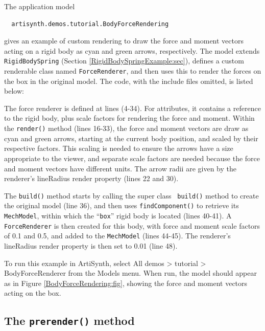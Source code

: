The application model
%
\begin{verbatim}
  artisynth.demos.tutorial.BodyForceRendering
\end{verbatim}
%
gives an example of custom rendering to draw the force and moment
vectors acting on a rigid body as cyan and green arrows,
respectively. The model extends {\tt RigidBodySpring}
(Section \ref{RigidBodySpringExample:sec}), defines a custom
renderable class named {\tt ForceRenderer}, and then uses this to
render the forces on the box in the original model. The code, with the
include files omitted, is listed below:
%
\lstset{numbers=left}
\iflatexml

\else

\fi
\lstset{numbers=none}
%
The force renderer is defined at lines (4-34). For attributes, it
contains a reference to the rigid body, plus scale factors for
rendering the force and moment. Within the {\tt render()} method
(lines 16-33), the force and moment vectors are draw as cyan and green
arrows, starting at the current body position, and scaled by their
respective factors. This scaling is needed to ensure the arrows have a
size appropriate to the viewer, and separate scale factors are needed
because the force and moment vectors have different units. The arrow
radii are given by the renderer's {\sf lineRadius} render property
(lines 22 and 30).

The {\tt build()} method starts by calling the super class {\tt
build()} method to create the original model (line 36), and then uses
{\tt findComponent()} to retrieve its {\tt MechModel}, within which
the ``{\tt box}'' rigid body is located (lines 40-41). A {\tt
ForceRenderer} is then created for this body, with force and moment
scale factors of 0.1 and 0.5, and added to the {\tt MechModel} (lines
44-45). The renderer's {\sf lineRadius} render property is then set to
0.01 (line 48).

To run this example in ArtiSynth, select {\sf All demos > tutorial >
BodyForceRenderer} from the {\sf Models} menu. When run, the model
should appear as in Figure \ref{BodyForceRendering:fig}, showing the
force and moment vectors acting on the box.

\subsection{The {\tt prerender()} method}
\label{PrerenderMethod:sec}

